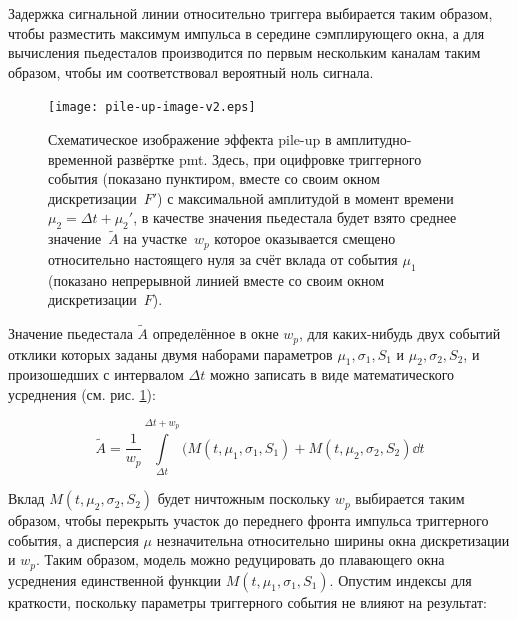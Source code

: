 

Задержка сигнальной линии относительно триггера выбирается таким
образом, чтобы разместить максимум импульса в середине сэмплирующего окна,
а для вычисления пьедесталов производится по первым нескольким каналам таким
образом, чтобы им соответствовал вероятный ноль сигнала.

\begin{figure}[h]
    \centering
    \texttt{[image: pile-up-image-v2.eps]}
    \caption{Схематическое изображение эффекта pile-up в амплитудно-временной
развёртке \acrshort{pmt}. Здесь, при оцифровке триггерного события (показано
пунктиром, вместе со своим окном дискретизации~$F'$) с максимальной
амплитудой в момент времени~$\mu_2 = \Delta t + \mu_2'$, в качестве значения
пьедестала будет взято среднее значение~$\tilde{A}$ на участке~$w_p$ которое
оказывается смещено относительно настоящего нуля за счёт вклада от события
$\mu_{1}$ (показано непрерывной линией вместе со своим окном дискретизации~$F$).}
    \label{fig:pileUpDiagram}
\end{figure}

Значение пьедестала $\tilde{A}$ определённое в окне
$w_p$, для каких-нибудь двух событий отклики которых заданы двумя наборами
параметров
$\mu_1, \sigma_1, S_1$ и $\mu_2, \sigma_2, S_2$, и произошедших с интервалом
$\Delta t$ можно записать в виде математического усреднения (см.
рис. \ref{fig:pileUpDiagram}):

\begin{equation}
\tilde{A} = \frac{1}{w_p} \int\limits_{\Delta t}^{\Delta t + w_p} (M(t, \mu_1, \sigma_1, S_1) + M(t, \mu_2, \sigma_2, S_2) \dd t
\end{equation}

Вклад $M(t, \mu_2, \sigma_2, S_2)$ будет ничтожным поскольку $w_p$ выбирается таким
образом, чтобы перекрыть участок до переднего фронта импульса триггерного
события, а дисперсия $\mu$ незначительна относительно ширины окна дискретизации
и $w_p$. Таким образом, модель можно редуцировать до плавающего окна усреднения
единственной функции $M(t, \mu_1, \sigma_1, S_1)$. Опустим индексы
для краткости, поскольку параметры триггерного события не влияют на результат: 

